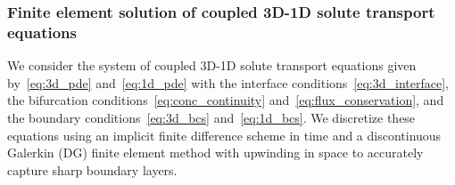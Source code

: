 

\subsubsection{Finite element solution of coupled 3D-1D solute transport equations }

We consider the system of coupled 3D-1D solute transport equations
given by~\eqref{eq:3d_pde} and~\eqref{eq:1d_pde} with the interface
conditions~\eqref{eq:3d_interface}, the bifurcation
conditions~\eqref{eq:conc_continuity}
and~\eqref{eq:flux_conservation}, and the boundary
conditions~\eqref{eq:3d_bcs} and~\eqref{eq:1d_bcs}. We discretize
these equations using an implicit finite difference scheme in time and
a discontinuous Galerkin (DG) finite element method with upwinding in
space to accurately capture sharp boundary layers.

